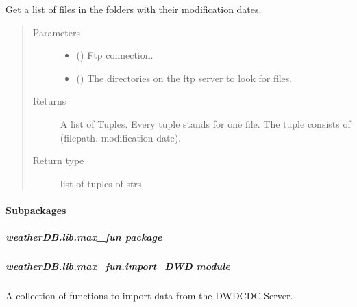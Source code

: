 \documentclass[letterpaper,10pt,english]{sphinxmanual}
\begin{document}
\begin{fulllineitems}
\label{\detokenize{weatherDB.lib:weatherDB.lib.utils.get_ftp_file_list}}
\sphinxAtStartPar
Get a list of files in the folders with their modification dates.
\begin{quote}\begin{description}
\item[{Parameters}] \leavevmode\begin{itemize}
\item {} 
\sphinxAtStartPar
{} () \textendash{} Ftp connection.

\item {} 
\sphinxAtStartPar
{} () \textendash{} The directories on the ftp server to look for files.

\end{itemize}

\item[{Returns}] \leavevmode
\sphinxAtStartPar
A list of Tuples. Every tuple stands for one file.
The tuple consists of (filepath, modification date).

\item[{Return type}] \leavevmode
\sphinxAtStartPar
list of tuples of strs

\end{description}\end{quote}

\end{fulllineitems}



\paragraph{Subpackages}
\label{\detokenize{weatherDB.lib:subpackages}}

\subparagraph{weatherDB.lib.max\_fun package}
\label{\detokenize{weatherDB.lib.max_fun:weatherdb-lib-max-fun-package}}\label{\detokenize{weatherDB.lib.max_fun::doc}}

\subparagraph{weatherDB.lib.max\_fun.import\_DWD module}
\label{\detokenize{weatherDB.lib.max_fun:module-weatherDB.lib.max_fun.import_DWD}}\label{\detokenize{weatherDB.lib.max_fun:weatherdb-lib-max-fun-import-dwd-module}}
\sphinxAtStartPar
A collection of functions to import data from the DWD\sphinxhyphen{}CDC Server.
\end{document}
